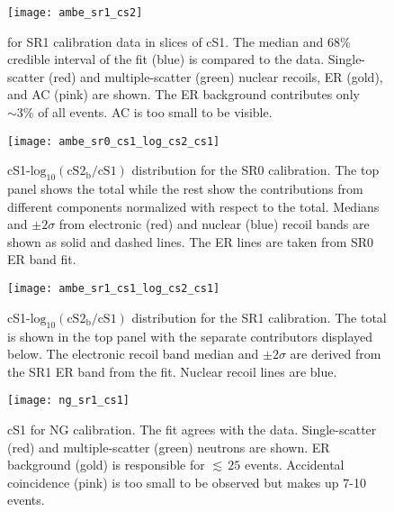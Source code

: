 \begin{figure}
\centering
\texttt{[image: ambe\_sr1\_cs2]}
\caption[\cstwob in slices of cS1 for SR1 \ambe data.]{\cstwob for SR1 \ambe calibration data in slices of cS1.  The median and 68\% credible
interval of the fit (blue) is compared
to the data.  Single-scatter (red) and multiple-scatter (green) nuclear recoils, ER (gold), and AC (pink) are shown.  The ER background
contributes only ${\sim}3\%$ of all events.  AC is too small to be visible.}
\label{fig:er_nr_calibrations_results_ambe_sr1_cs2}
\end{figure}

\begin{figure}
\centering
\texttt{[image: ambe\_sr0\_cs1\_log\_cs2\_cs1]}
\caption[cS1-$\mathrm{log}_{10}(\mathrm{cS2_b / cS1})$ distribution for the SR0 \ambe calibration.  The top panel shows the
total while the rest show the contributions from different components normalized with respect to the total.  Medians and $\pm 2\sigma$
from electronic and nuclear recoil bands are shown.]{cS1-$\mathrm{log}_{10}(\mathrm{cS2_b / cS1})$ distribution for the SR0 \ambe
calibration.  The top panel shows the
total while the rest show the contributions from different components normalized with respect to the total.  Medians and $\pm 2\sigma$
from electronic (red) and nuclear (blue) recoil bands are shown as solid and dashed lines.  The ER lines are taken from SR0 ER band fit.}
\label{fig:er_nr_calibrations_results_ambe_sr0_cs1_log_cs2_cs1}
\end{figure}

\begin{figure}
\centering
\texttt{[image: ambe\_sr1\_cs1\_log\_cs2\_cs1]}
\caption[cS1-$\mathrm{log}_{10}(\mathrm{cS2_b / cS1})$ distribution for the SR1 \ambe calibration.  The top panel shows the
total while the rest show the contributions from different components normalized with respect to the total.  Medians and $\pm 2\sigma$
from electronic and nuclear recoil bands are shown.]{cS1-$\mathrm{log}_{10}(\mathrm{cS2_b / cS1})$ distribution for the SR1 \ambe
calibration.  The total is shown
in the top panel with the separate contributors displayed below.  The electronic recoil band median and $\pm 2\sigma$ are derived
from the SR1 ER band from the fit.  Nuclear recoil lines are blue.}
\label{fig:er_nr_calibrations_results_ambe_sr1_cs1_log_cs2_cs1}
\end{figure}

\begin{figure}
\centering
\texttt{[image: ng\_sr1\_cs1]}
\caption[cS1 for NG calibration.]{cS1 for NG calibration.  The fit agrees with the data.  Single-scatter (red) and multiple-scatter (green)
neutrons are shown.  ER
background (gold) is responsible for ${\lesssim}\, 25$ events.  Accidental coincidence (pink) is too small to be observed but makes up
7-10 events.}
\label{fig:er_nr_calibrations_results_ng_sr1_cs1}
\end{figure}


